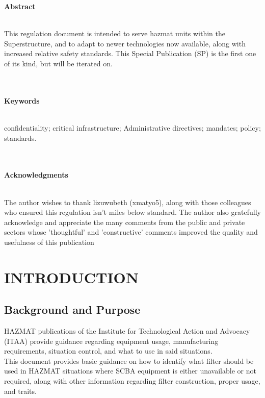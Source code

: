 \documentclass[a4paper, 12pt]{article}
\begin{document}
{	\newpage
	
	\centering \large \textbf{Abstract} \\\raggedright \normalsize \-\\
	This regulation document is intended to serve hazmat units within the Superstructure, and to adapt to newer technologies now available, along with increased relative safety standards. This Special Publication (SP) is the first one of its kind, but will be iterated on.\\ \-\\\mbox{ }
	
	\centering \large \textbf{Keywords} \\\raggedright \normalsize \-\\
	confidentiality; critical infrastructure; Administrative directives; mandates; policy; standards. \\ \-\\\mbox{ }
	
	\centering \large \textbf{Acknowledgments} \\\raggedright \normalsize \-\\
	The author wishes to thank lizuwubeth (xmatyo5), along with those colleagues who ensured this regulation isn't miles below standard. The author also gratefully acknowledge and appreciate the many comments from the public and private sectors whose 'thoughtful' and 'constructive' comments improved the quality and usefulness of this publication
	
	\newpage
	
	\tableofcontents
	
	\newpage
	
	\section{INTRODUCTION}	
	\subsection{Background and Purpose}
	HAZMAT publications of the Institute for Technological Action and Advocacy (ITAA) provide guidance regarding equipment usage, manufacturing requirements, situation control, and what to use in said situations. \\
	This document provides basic guidance on how to identify what filter should be used in HAZMAT situations where SCBA equipment is either unavailable or not required, along with other information regarding filter construction, proper usage, and traits. \\
}
\end{document}
